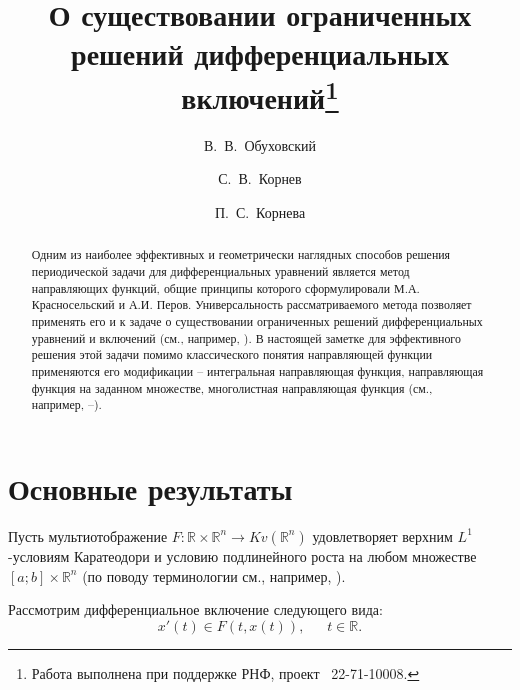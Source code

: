 \title{О существовании ограниченных решений дифференциальных включений\thanks{Работа выполнена при поддержке РНФ, проект \textnumero~22-71-10008.}}
\author{В.~В.~Обуховский \and С.~В.~Корнев  \and  П.~С.~Корнева
} %


\maketitle

\begin{abstract}
Одним из наиболее эффективных и геометрически наглядных способов решения периодической задачи для дифференциальных уравнений является метод направляющих функций, общие принципы которого сформулировали М.А. Красносельский и А.И. Перов. Универсальность рассматриваемого метода позволяет применять его и к задаче о существовании ограниченных решений дифференциальных уравнений и включений (см., например, \cite{k_kr}).
В настоящей заметке для эффективного решения этой задачи помимо классического понятия направляющей функции применяются его модификации -- интегральная направляющая функция, направляющая функция на заданном множестве, многолистная направляющая функция (см., например, \cite{k_b_g_m_o}--\cite{k_k_o_z_2}).

\end{abstract}

\section{Основные результаты} %

Пусть мультиотображение $F:\mathbb{R} \times \mathbb{R}^n \to Kv(\mathbb{R}^n)$ удовлетворяет верхним $L^1$-условиям Каратеодори и условию подлинейного роста на любом множестве $[a;b]\times \mathbb{R}^n$ (по поводу терминологии см., например, \cite{k_b_g_m_o}).


Рассмотрим диф\-ференциальное включение следующего вида:
\begin{equation}
\label{eq2.1}
x'(t)\in F(t,x(t)),\quad\;\;t\in\mathbb{R}.
\end{equation}


